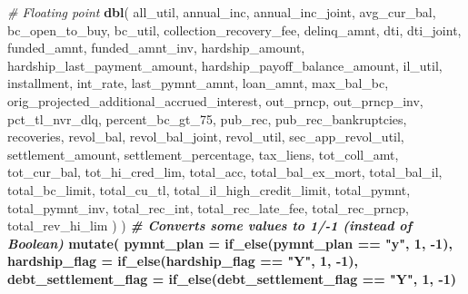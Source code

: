 \documentclass[11pt,]{report}
\newenvironment{Shaded}{\begin{snugshade}}{\end{snugshade}}
\newcommand{\CommentTok}[1]{\textcolor[rgb]{0.56,0.35,0.01}{\textit{#1}}}
\newcommand{\DataTypeTok}[1]{\textcolor[rgb]{0.13,0.29,0.53}{#1}}
\newcommand{\DecValTok}[1]{\textcolor[rgb]{0.00,0.00,0.81}{#1}}
\newcommand{\KeywordTok}[1]{\textcolor[rgb]{0.13,0.29,0.53}{\textbf{#1}}}
\newcommand{\NormalTok}[1]{#1}
\newcommand{\OperatorTok}[1]{\textcolor[rgb]{0.81,0.36,0.00}{\textbf{#1}}}
\newcommand{\StringTok}[1]{\textcolor[rgb]{0.31,0.60,0.02}{#1}}
\begin{document}
\begin{Shaded}
\begin{Highlighting}[numbers=left,,]
{{{      \CommentTok{# Floating point}
      \KeywordTok{dbl}\NormalTok{(}
\NormalTok{        all_util,}
\NormalTok{        annual_inc,}
\NormalTok{        annual_inc_joint,}
\NormalTok{        avg_cur_bal,}
\NormalTok{        bc_open_to_buy,}
\NormalTok{        bc_util,}
\NormalTok{        collection_recovery_fee,}
\NormalTok{        delinq_amnt,}
\NormalTok{        dti,}
\NormalTok{        dti_joint,}
\NormalTok{        funded_amnt,}
\NormalTok{        funded_amnt_inv,}
\NormalTok{        hardship_amount,}
\NormalTok{        hardship_last_payment_amount,}
\NormalTok{        hardship_payoff_balance_amount,}
\NormalTok{        il_util,}
\NormalTok{        installment,}
\NormalTok{        int_rate,}
\NormalTok{        last_pymnt_amnt,}
\NormalTok{        loan_amnt,}
\NormalTok{        max_bal_bc,}
\NormalTok{        orig_projected_additional_accrued_interest,}
\NormalTok{        out_prncp,}
\NormalTok{        out_prncp_inv,}
\NormalTok{        pct_tl_nvr_dlq,}
\NormalTok{        percent_bc_gt_}\DecValTok{75}\NormalTok{,}
\NormalTok{        pub_rec,}
\NormalTok{        pub_rec_bankruptcies,}
\NormalTok{        recoveries,}
\NormalTok{        revol_bal,}
\NormalTok{        revol_bal_joint,}
\NormalTok{        revol_util,}
\NormalTok{        sec_app_revol_util,}
\NormalTok{        settlement_amount,}
\NormalTok{        settlement_percentage,}
\NormalTok{        tax_liens,}
\NormalTok{        tot_coll_amt,}
\NormalTok{        tot_cur_bal,}
\NormalTok{        tot_hi_cred_lim,}
\NormalTok{        total_acc,}
\NormalTok{        total_bal_ex_mort,}
\NormalTok{        total_bal_il,}
\NormalTok{        total_bc_limit,}
\NormalTok{        total_cu_tl,}
\NormalTok{        total_il_high_credit_limit,}
\NormalTok{        total_pymnt,}
\NormalTok{        total_pymnt_inv,}
\NormalTok{        total_rec_int,}
\NormalTok{        total_rec_late_fee,}
\NormalTok{        total_rec_prncp,}
\NormalTok{        total_rev_hi_lim}
\NormalTok{      )}
\NormalTok{    ) }\OperatorTok{%
\StringTok{    }
\StringTok{    }\CommentTok{# Converts some values to 1/-1 (instead of Boolean)}
\StringTok{    }\KeywordTok{mutate}\NormalTok{(}
      \DataTypeTok{pymnt_plan =}           \KeywordTok{if_else}\NormalTok{(pymnt_plan }\OperatorTok{==}\StringTok{ "y"}\NormalTok{,           }\DecValTok{1}\NormalTok{, }\DecValTok{-1}\NormalTok{),}
      \DataTypeTok{hardship_flag =}        \KeywordTok{if_else}\NormalTok{(hardship_flag }\OperatorTok{==}\StringTok{ "Y"}\NormalTok{,        }\DecValTok{1}\NormalTok{, }\DecValTok{-1}\NormalTok{),}
      \DataTypeTok{debt_settlement_flag =} \KeywordTok{if_else}\NormalTok{(debt_settlement_flag }\OperatorTok{==}\StringTok{ "Y"}\NormalTok{, }\DecValTok{1}\NormalTok{, }\DecValTok{-1}\NormalTok{)}
}}}}
\end{Highlighting}
\end{Shaded}
\end{document}
